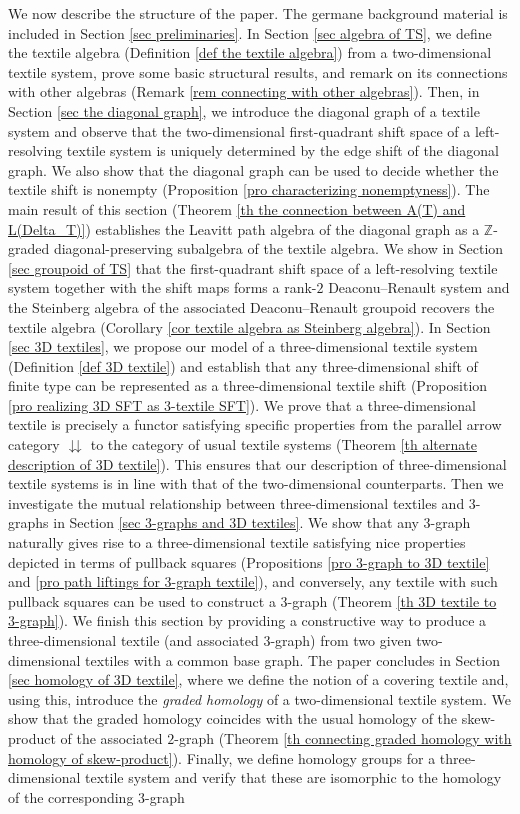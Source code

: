 \documentclass[a4paper,reqno,12pt]{amsart}
\theoremstyle{definition}
\theoremstyle{remark}
\begin{document}
We now describe the structure of the paper. The germane background material is included in Section \ref{sec preliminaries}. 
In Section \ref{sec algebra of TS}, we define the textile algebra (Definition \ref{def the textile algebra}) from a two-dimensional textile system, prove some basic structural results, and remark on its connections with other algebras (Remark \ref{rem connecting with other algebras}). Then, in Section \ref{sec the diagonal graph}, we introduce the diagonal graph of a textile system and observe that the two-dimensional first-quadrant shift space of a left-resolving textile system is uniquely determined by the edge shift of the diagonal graph. We also show that the diagonal graph can be used to decide whether the textile shift is nonempty (Proposition \ref{pro characterizing nonemptyness}). The main result of this section (Theorem \ref{th the connection between A(T) and L(Delta_T)}) establishes the Leavitt path algebra of the diagonal graph as a $\mathbb{Z}$-graded diagonal-preserving subalgebra of the textile algebra. We show in Section \ref{sec groupoid of TS} that the first-quadrant shift space of a left-resolving textile system together with the shift maps forms a rank-$2$ Deaconu--Renault system and the Steinberg algebra of the associated Deaconu--Renault groupoid recovers the textile algebra (Corollary \ref{cor textile algebra as Steinberg algebra}). In Section \ref{sec 3D textiles}, we propose our model of a three-dimensional textile system (Definition \ref{def 3D textile}) and establish that any three-dimensional shift of finite type can be represented as a three-dimensional textile shift (Proposition \ref{pro realizing 3D SFT as 3-textile SFT}). We prove that a three-dimensional textile is precisely a functor satisfying specific properties from the parallel arrow category $\downdownarrows$ to the category of usual textile systems (Theorem \ref{th alternate description of 3D textile}). This ensures that our description of three-dimensional textile systems is in line with that of the two-dimensional counterparts. Then we investigate the mutual relationship between three-dimensional textiles and $3$-graphs in Section \ref{sec 3-graphs and 3D textiles}. We show that any $3$-graph naturally gives rise to a three-dimensional textile satisfying nice properties depicted in terms of pullback squares (Propositions \ref{pro 3-graph to 3D textile} and \ref{pro path liftings for 3-graph textile}), and conversely, any textile with such pullback squares can be used to construct a $3$-graph (Theorem \ref{th 3D textile to 3-graph}). We finish this section by providing a constructive way to produce a three-dimensional textile (and associated $3$-graph) from two given two-dimensional textiles with a common base graph. The paper concludes in Section \ref{sec homology of 3D textile}, where we define the notion of a covering textile and, using this, introduce the \emph{graded homology} of a two-dimensional textile system. We show that the graded homology coincides with the usual homology of the skew-product of the associated $2$-graph (Theorem \ref{th connecting graded homology with homology of skew-product}). Finally, we define homology groups for a three-dimensional textile system and verify that these are isomorphic to the homology of the corresponding $3$-graph 
\end{document}
